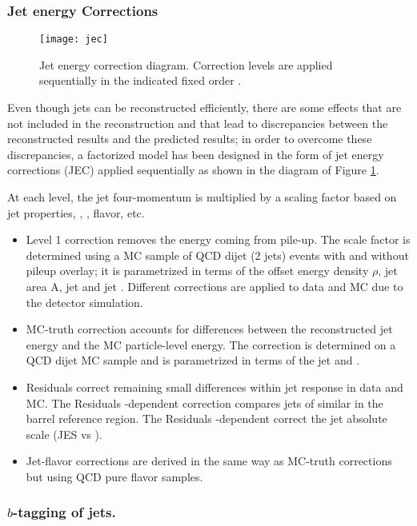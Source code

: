 \subsubsection*{Jet energy Corrections}

\begin{figure}[!h]
  \centering
  \texttt{[image: jec]}
  \caption[Jet energy corrections.]{Jet energy correction diagram. Correction levels are applied sequentially in the indicated fixed order \cite{jec2}.}\label{fig:jec}
\end{figure}

Even though jets can be reconstructed efficiently, there are some effects that are not included in the reconstruction and that lead to discrepancies between the reconstructed results and the predicted results; in order to overcome these discrepancies, a factorized model has been designed in the form of jet energy corrections (JEC) \cite{jec,jec2} applied  sequentially as shown in the diagram of Figure \ref{fig:jec}.

At each level, the jet four-momentum is multiplied by a scaling factor based on jet properties, \ie, \etac, flavor, etc.

\begin{itemize}
\item Level 1 correction removes the energy coming from pile-up. The scale factor is determined using a MC sample of QCD dijet (2 jets) events with and without pileup overlay; it is parametrized in terms of the offset energy density $\rho$, jet area A, jet \etac and jet \pt. Different corrections are applied to data and MC due to the detector simulation.
\item MC-truth correction accounts for differences between the reconstructed jet energy and the MC particle-level energy. The correction is determined on a QCD dijet MC sample and is parametrized in terms of the jet \pt and \etac.
\item Residuals correct remaining small differences within jet response in data and MC. The Residuals \etac-dependent correction compares jets of similar \pt in the barrel reference region. The Residuals \pt-dependent correct the jet absolute scale (JES vs \pt).
\item Jet-flavor corrections are derived in the same way as MC-truth corrections but using QCD pure flavor samples. 
\end{itemize}  

\subsubsection*{$b$-tagging of jets.}

